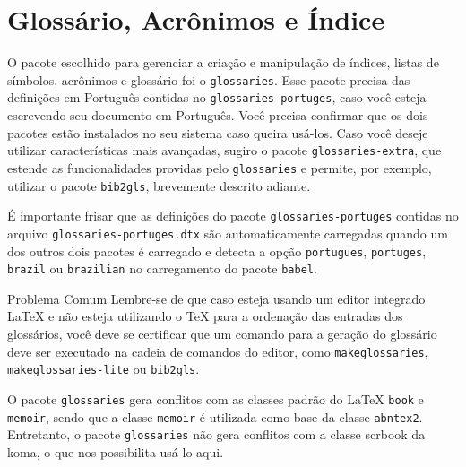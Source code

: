 \chapter{Glossário, Acrônimos e Índice}\label{cap:glossario}

O pacote escolhido para gerenciar a criação e manipulação de índices, listas de símbolos, acrônimos e glossário foi o \texttt{glossaries}. Esse pacote precisa das definições em Português contidas no \texttt{glossaries-portuges}, caso você esteja escrevendo seu documento em Português. Você precisa confirmar que os dois pacotes estão instalados no seu sistema caso queira usá-los. Caso você deseje utilizar características mais avançadas, sugiro o pacote \texttt{glossaries-extra}, que estende as funcionalidades providas pelo \texttt{glossaries} e permite, por exemplo, utilizar o pacote \texttt{bib2gls}, brevemente descrito adiante.

É importante frisar que as definições do pacote \texttt{glossaries-portuges} contidas no arquivo \texttt{glossaries-portuges.dtx}  são automaticamente carregadas quando um dos outros dois pacotes é carregado e detecta a opção \texttt{portugues}, \texttt{portuges}, \texttt{brazil} ou \texttt{brazilian} no carregamento do pacote \texttt{babel}. 

\begin{bclogo}[
	couleur=bgblue,
	arrondi=0,
	logo=\faWarning,%
	barre=none,
	noborder=true]{Problema Comum}
	Lembre-se de que caso esteja usando um editor integrado \LaTeX{} e não esteja utilizando o \TeX{} para a ordenação das entradas dos glossários, você deve se certificar que um comando para a geração do glossário deve ser executado na cadeia de comandos do editor, como \texttt{makeglossaries}, \texttt{makeglossaries-lite} ou \texttt{bib2gls}. 
\end{bclogo}

O pacote \texttt{glossaries} gera conflitos com as classes padrão do \LaTeX{} \texttt{book} e \texttt{memoir}, sendo que a classe \texttt{memoir} é utilizada como base da classe \texttt{abntex2}. Entretanto, o pacote \texttt{glossaries} não gera conflitos com a classe \gls{scrbook} da \gls{koma}, o que nos possibilita usá-lo aqui. 

